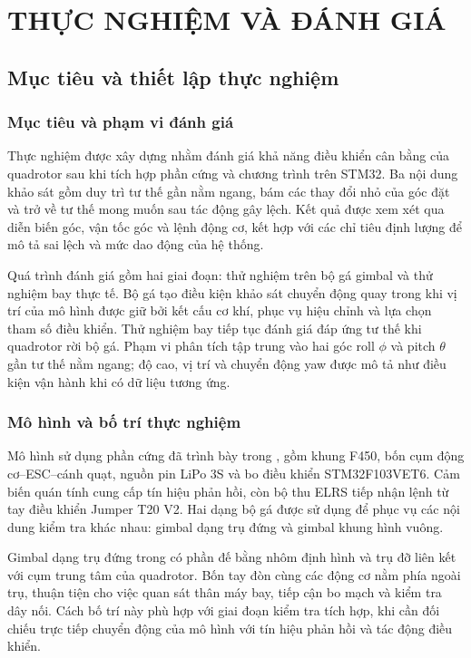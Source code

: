 \chapter{THỰC NGHIỆM VÀ ĐÁNH GIÁ}
\label{chap:evaluation}

\section{Mục tiêu và thiết lập thực nghiệm}
\label{sec:evaluation-setup}

\subsection{Mục tiêu và phạm vi đánh giá}

Thực nghiệm được xây dựng nhằm đánh giá khả năng điều khiển cân bằng của quadrotor sau khi tích hợp phần cứng và chương trình trên STM32. Ba nội dung khảo sát gồm duy trì tư thế gần nằm ngang, bám các thay đổi nhỏ của góc đặt và trở về tư thế mong muốn sau tác động gây lệch. Kết quả được xem xét qua diễn biến góc, vận tốc góc và lệnh động cơ, kết hợp với các chỉ tiêu định lượng để mô tả sai lệch và mức dao động của hệ thống.

Quá trình đánh giá gồm hai giai đoạn: thử nghiệm trên bộ gá gimbal và thử nghiệm bay thực tế. Bộ gá tạo điều kiện khảo sát chuyển động quay trong khi vị trí của mô hình được giữ bởi kết cấu cơ khí, phục vụ hiệu chỉnh và lựa chọn tham số điều khiển. Thử nghiệm bay tiếp tục đánh giá đáp ứng tư thế khi quadrotor rời bộ gá. Phạm vi phân tích tập trung vào hai góc roll $\phi$ và pitch $\theta$ gần tư thế nằm ngang; độ cao, vị trí và chuyển động yaw được mô tả như điều kiện vận hành khi có dữ liệu tương ứng.

\subsection{Mô hình và bố trí thực nghiệm}

Mô hình sử dụng phần cứng đã trình bày trong , gồm khung F450, bốn cụm động cơ--ESC--cánh quạt, nguồn pin LiPo 3S và bo điều khiển STM32F103VET6. Cảm biến quán tính cung cấp tín hiệu phản hồi, còn bộ thu ELRS tiếp nhận lệnh từ tay điều khiển Jumper T20 V2. Hai dạng bộ gá được sử dụng để phục vụ các nội dung kiểm tra khác nhau: gimbal dạng trụ đứng và gimbal khung hình vuông.

Gimbal dạng trụ đứng trong  có phần đế bằng nhôm định hình và trụ đỡ liên kết với cụm trung tâm của quadrotor. Bốn tay đòn cùng các động cơ nằm phía ngoài trụ, thuận tiện cho việc quan sát thân máy bay, tiếp cận bo mạch và kiểm tra dây nối. Cách bố trí này phù hợp với giai đoạn kiểm tra tích hợp, khi cần đối chiếu trực tiếp chuyển động của mô hình với tín hiệu phản hồi và tác động điều khiển.

